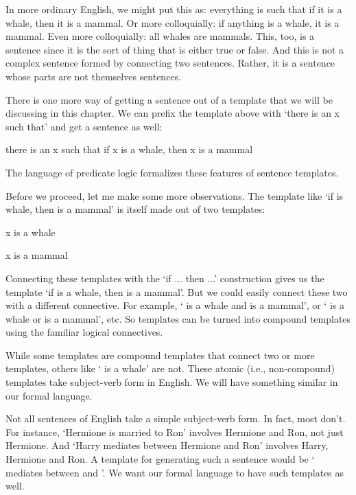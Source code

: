 In more ordinary English, we might put this as: everything is such that if it is 
a whale, then it is a mammal. Or more colloquially: if anything is a whale,
 it is a mammal. Even more colloquially: all whales are mammals.  This, too, is 
 a sentence since it is the sort of thing that is either true or false.  And 
 this is not a complex sentence formed by connecting two sentences.  Rather, it 
 is a sentence whose parts are not themselves sentences.

There is one more way of getting a sentence out of a template that we will be 
discussing in this chapter. We can prefix the template above with `there is an x 
such that' and get a sentence as well:

\begin{center}

 there is an x such that if x is a whale, then x is a mammal

\end{center}


The language of predicate logic formalizes these features of sentence templates.

Before we proceed, let me make some more observations. The template like `if 
 is whale, then  is a mammal' is itself made out of two templates:
\begin{center}

 x is a whale

 x is a mammal

\end{center}

Connecting these templates with the `if ... then ...' construction gives us the 
template `if  is a whale, then  is a mammal'. But we could easily 
connect these two with a different connective. For example, ` is a whale 
and  is a mammal', or ` is a whale or  is a mammal', etc. So 
templates can be turned into compound templates using the familiar logical 
connectives.

While some templates are compound templates that connect two or more templates, 
others like ` is a whale' are not. These atomic (i.e., non-compound)
templates take subject-verb form in English. We will have something similar in 
our formal language. 

Not all sentences of English take a simple subject-verb form. In fact, most 
don't. For instance, `Hermione is married to Ron' involves Hermione and Ron, not 
just Hermione. And `Harry mediates between Hermione and Ron' involves Harry, 
Hermione and Ron. A template for generating such a sentence would be ` 
mediates between  and '.  We want our formal language to have such 
templates as well.






